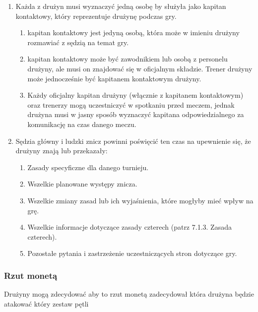 \documentclass[12pt]{article}
\begin{document}
\begin{enumerate}
	\item
	      Każda z drużyn musi wyznaczyć jedną osobę by służyła jako kapitan
	      kontaktowy, który reprezentuje drużynę podczas gry.

	      \begin{enumerate}
		      \item
		            kapitan kontaktowy jest jedyną osobą, która może w imieniu drużyny
		            rozmawiać z sędzią na temat gry.
		      \item
		            kapitan kontaktowy może być zawodnikiem lub osobą z personelu
		            drużyny, ale musi on znajdować się w oficjalnym składzie. Trener
		            drużyny może jednocześnie być kapitanem kontaktowym drużyny.
		      \item
		            Każdy oficjalny kapitan drużyny (włącznie z kapitanem kontaktowym)
		            oraz trenerzy mogą uczestniczyć w spotkaniu przed meczem, jednak
		            drużyna musi w jasny sposób wyznaczyć kapitana odpowiedzialnego za
		            komunikację na czas danego meczu.
	      \end{enumerate}
	\item
	      Sędzia główny i ludzki znicz powinni poświęcić ten czas na upewnienie
	      się, że drużyny znają lub przekazały:

	      \begin{enumerate}
		      \item
		            Zasady specyficzne dla danego turnieju.
		      \item
		            Wszelkie planowane występy znicza.
		      \item
		            Wszelkie zmiany zasad lub ich wyjaśnienia, które mogłyby mieć wpływ
		            na grę.
		      \item
		            Wszelkie informacje dotyczące zasady czterech (patrz 7.1.3. Zasada
		            czterech).
		      \item
		            Pozostałe pytania i zastrzeżenie uczestniczących stron dotyczące
		            gry.
	      \end{enumerate}
\end{enumerate}

\subsubsection{Rzut monetą}
Drużyny mogą zdecydować aby to rzut
monetą zadecydował która drużyna będzie atakować który zestaw pętli
\end{document}
